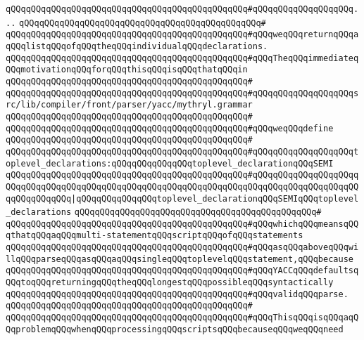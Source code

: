 \verb|qQQqqQQqqQQqqQQqqQQqqQQqqQQqqQQqqQQqqQQqqQQqqQQq#qQQqqQQqqQQqqQQqqQQq...|\newline
\verb|qQQqqQQqqQQqqQQqqQQqqQQqqQQqqQQqqQQqqQQqqQQqqQQq#|\newline
\verb|qQQqqQQqqQQqqQQqqQQqqQQqqQQqqQQqqQQqqQQqqQQqqQQq#qQQqweqQQqreturnqQQqaqQQqlistqQQqofqQQqtheqQQqindividualqQQqdeclarations.|\newline
\verb|qQQqqQQqqQQqqQQqqQQqqQQqqQQqqQQqqQQqqQQqqQQqqQQq#qQQqTheqQQqimmediateqQQqmotivationqQQqforqQQqthisqQQqisqQQqthatqQQqin|\newline
\verb|qQQqqQQqqQQqqQQqqQQqqQQqqQQqqQQqqQQqqQQqqQQqqQQq#|\newline
\verb|qQQqqQQqqQQqqQQqqQQqqQQqqQQqqQQqqQQqqQQqqQQqqQQq#qQQqqQQqqQQqqQQqqQQqsrc/lib/compiler/front/parser/yacc/mythryl.grammar|\newline
\verb|qQQqqQQqqQQqqQQqqQQqqQQqqQQqqQQqqQQqqQQqqQQqqQQq#|\newline
\verb|qQQqqQQqqQQqqQQqqQQqqQQqqQQqqQQqqQQqqQQqqQQqqQQq#qQQqweqQQqdefine|\newline
\verb|qQQqqQQqqQQqqQQqqQQqqQQqqQQqqQQqqQQqqQQqqQQqqQQq#|\newline
\verb|qQQqqQQqqQQqqQQqqQQqqQQqqQQqqQQqqQQqqQQqqQQqqQQq#qQQqqQQqqQQqqQQqqQQqtoplevel_declarations:qQQqqQQqqQQqqQQqtoplevel_declarationqQQqSEMI|\newline
\verb|qQQqqQQqqQQqqQQqqQQqqQQqqQQqqQQqqQQqqQQqqQQqqQQq#qQQqqQQqqQQqqQQqqQQqqQQqqQQqqQQqqQQqqQQqqQQqqQQqqQQqqQQqqQQqqQQqqQQqqQQqqQQqqQQqqQQqqQQqqQQqqQQqqQQqqQQq|\verb#|qQQqqQQqqQQqqQQqtoplevel_declarationqQQqSEMIqQQqtoplevel_declarations#\newline
\verb|qQQqqQQqqQQqqQQqqQQqqQQqqQQqqQQqqQQqqQQqqQQqqQQq#|\newline
\verb|qQQqqQQqqQQqqQQqqQQqqQQqqQQqqQQqqQQqqQQqqQQqqQQq#qQQqwhichqQQqmeansqQQqthatqQQqaqQQqmulti-statementqQQqscriptqQQqofqQQqstatements|\newline
\verb|qQQqqQQqqQQqqQQqqQQqqQQqqQQqqQQqqQQqqQQqqQQqqQQq#qQQqasqQQqaboveqQQqwillqQQqparseqQQqasqQQqaqQQqsingleqQQqtoplevelqQQqstatement,qQQqbecause|\newline
\verb|qQQqqQQqqQQqqQQqqQQqqQQqqQQqqQQqqQQqqQQqqQQqqQQq#qQQqYACCqQQqdefaultsqQQqtoqQQqreturningqQQqtheqQQqlongestqQQqpossibleqQQqsyntactically|\newline
\verb|qQQqqQQqqQQqqQQqqQQqqQQqqQQqqQQqqQQqqQQqqQQqqQQq#qQQqvalidqQQqparse.|\newline
\verb|qQQqqQQqqQQqqQQqqQQqqQQqqQQqqQQqqQQqqQQqqQQqqQQq#|\newline
\verb|qQQqqQQqqQQqqQQqqQQqqQQqqQQqqQQqqQQqqQQqqQQqqQQq#qQQqThisqQQqisqQQqaqQQqproblemqQQqwhenqQQqprocessingqQQqscriptsqQQqbecauseqQQqweqQQqneed|\newline
